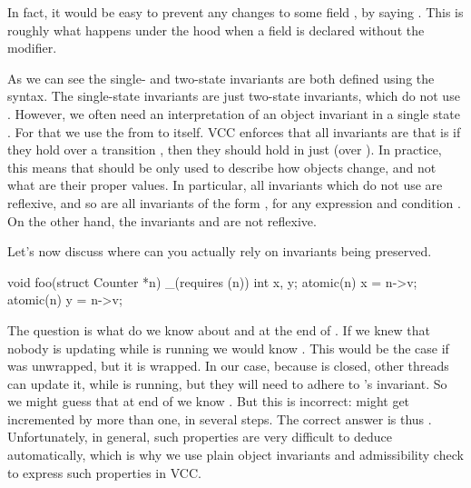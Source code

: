 \begin{note}
In fact, it would be easy to prevent any changes to some field , by
saying .
This is roughly what happens under the hood when a field is
declared without the  modifier.
\end{note}

As we can see the single- and two-state invariants are both defined
using the  syntax.
The single-state invariants are just two-state invariants, which do not use
.
However, we often need an interpretation of an object invariant in a single state .
For that we use the  from  to  itself.
VCC enforces that all invariants are  that is if they hold
over a transition , then they should hold in just 
(\ie over ).
In practice,
this means that  should be only used to describe
how objects change, and not what are their proper values.
In particular,
all invariants which do not use  are reflexive, and so
are all invariants of the form , for any expression  and condition .
On the other hand, the invariants  and  are not reflexive.

Let's now discuss where can you actually rely on invariants being preserved.

\begin{VCC}
void foo(struct Counter *n)
  _(requires \wrapped(n))
{
  int x, y;
  atomic(n) { x = n->v; }
  atomic(n) { y = n->v; }
}
\end{VCC}

\noindent
The question is what do we know about  and 
at the end of .
If we knew that nobody is updating  while 
is running we would know .
This would be the case if  was unwrapped, but it is wrapped.
In our case, because  is closed, other threads can update it,
while  is running, but they will need to
adhere to 's invariant.
So we might guess that at end of  we know
.
But this is incorrect:  might get incremented
by more than one, in several steps.
The correct answer is thus .
Unfortunately, in general, such properties are very difficult to deduce
automatically, which is why we use plain object invariants and admissibility
check to express such properties in VCC.

